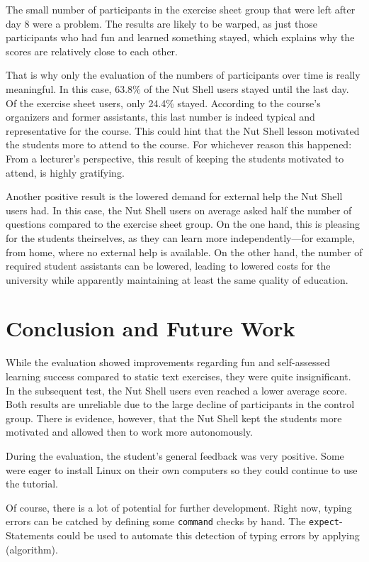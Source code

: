 \documentclass[paper=a4,twoside,abstract=on,cleardoublepage=empty,numbers=noenddot,toc=bib,11pt,appendixprefix=true]{scrreprt}
\begin{document}
The small number of participants in the exercise sheet group that were left after day 8 were a problem. The results are likely to be warped, as just those participants who had fun and learned something stayed, which explains why the scores are relatively close to each other.

That is why only the evaluation of the numbers of participants over time is really meaningful. In this case, 63.8\% of the Nut Shell users stayed until the last day. Of the exercise sheet users, only 24.4\% stayed. According to the course's organizers and former assistants, this last number is indeed typical and representative for the course. This could hint that the Nut Shell lesson motivated the students more to attend to the course. For whichever reason this happened: From a lecturer's perspective, this result of keeping the students motivated to attend, is highly gratifying.

Another positive result is the lowered demand for external help the Nut Shell users had. In this case, the Nut Shell users on average asked half the number of questions compared to the exercise sheet group. On the one hand, this is pleasing for the students theirselves, as they can learn more independently---for example, from home, where no external help is available. On the other hand, the number of required student assistants can be lowered, leading to lowered costs for the university while apparently maintaining at least the same quality of education.

\chapter{Conclusion and Future Work}

While the evaluation showed improvements regarding fun and self-assessed learning success compared to static text exercises, they were quite insignificant. In the subsequent test, the Nut Shell users even reached a lower average score. Both results are unreliable due to the large decline of participants in the control group. There is evidence, however, that the Nut Shell kept the students more motivated and allowed then to work more autonomously.

During the evaluation, the student's general feedback was very positive. Some were eager to install Linux on their own computers so they could continue to use the tutorial.

Of course, there is a lot of potential for further development. Right now, typing errors can be catched by defining some \texttt{command} checks by hand. The \texttt{expect}-Statements could be used to automate this detection of typing errors by applying (algorithm).
\end{document}
